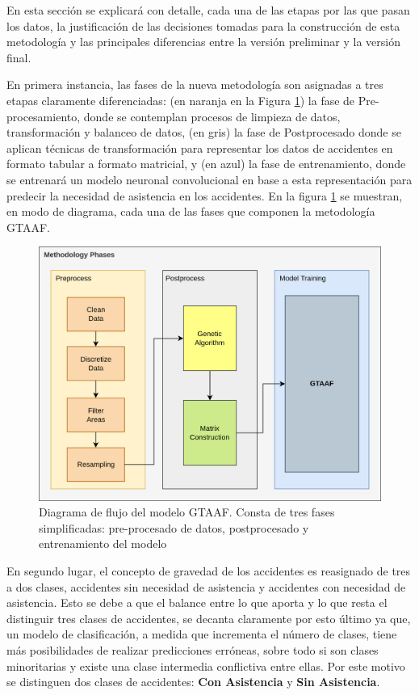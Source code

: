 En esta sección se explicará con detalle, cada una de las etapas por las que pasan los datos, la justificación de las decisiones tomadas para la construcción de esta metodología y las principales diferencias entre la versión preliminar y la versión final.

En primera instancia, las fases de la nueva metodología son asignadas a tres etapas claramente diferenciadas: (en naranja en la Figura \ref{DataFlow}) la fase de Pre-procesamiento, donde se contemplan procesos de limpieza de datos, transformación y balanceo de datos, (en gris) la fase de Postprocesado donde se aplican técnicas de transformación para representar los datos de accidentes en formato tabular a formato matricial, y (en azul) la fase de entrenamiento, donde se entrenará un modelo neuronal convolucional en base a esta representación para predecir la necesidad de asistencia en los accidentes. En la figura \ref{DataFlow} se muestran, en modo de diagrama, cada una de las fases que componen la metodología GTAAF.

\begin{figure}[H]
	\centering
	\includegraphics[width=14cm]{Figures/7th DataFlow Chart.png}
	\caption[Diagrama de flujo del modelo GTAAF]{Diagrama de flujo del modelo GTAAF. Consta de tres fases simplificadas: pre-procesado de datos, postprocesado y entrenamiento del modelo}
	\label{DataFlow}
\end{figure}

En segundo lugar, el concepto de gravedad de los accidentes es reasignado de tres a dos clases, accidentes sin necesidad de asistencia y accidentes con necesidad de asistencia. Esto se debe a que el balance entre lo que aporta y lo que resta el distinguir tres clases de accidentes, se decanta claramente por esto último ya que, un modelo de clasificación, a medida que incrementa el número de clases, tiene más posibilidades de realizar predicciones erróneas, sobre todo si son clases minoritarias y existe una clase intermedia conflictiva entre ellas. Por este motivo se distinguen dos clases de accidentes: \textbf{Con Asistencia} y \textbf{Sin Asistencia}.

